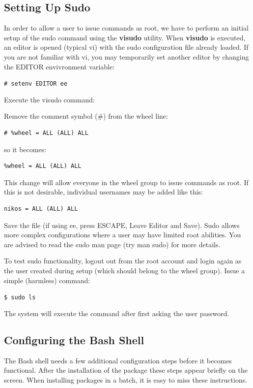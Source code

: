 \documentclass[a4paper,twoside,12pt]{article}
\newcommand{\coderoot}[1]{\texttt{\# #1}}
\newcommand{\codeuser}[1]{\texttt{\$ #1}}
\begin{document}
\subsection{Setting Up Sudo}
In order to allow a user to issue commands as root, we have to perform an initial setup of the sudo command using the \textbf{visudo} utility. When \textbf{visudo} is executed, an editor is opened (typical vi) with the sudo configuration file already loaded. If you are not familiar with vi, you may temporarily set another editor by changing the EDITOR envivronment variable:

\coderoot{setenv EDITOR ee}

Execute the visudo command:


Remove the comment symbol (#) from the wheel line:

\begin{verbatim}
# %wheel = ALL (ALL) ALL
\end{verbatim}

so it becomes:

\begin{verbatim}
%wheel = ALL (ALL) ALL
\end{verbatim}

This change will allow everyone in the wheel group to issue commands as root. If this is not desirable, individual usernames may be added like this:

\begin{verbatim}
nikos = ALL (ALL) ALL
\end{verbatim}

Save the file (if using ee, press ESCAPE, Leave Editor and Save).
Sudo allows more complex configurations where a user may have limited root abilities. You are advised to read the sudo man page (try man sudo) for more details.

To test sudo functionality, logout out from the root account and login again as the user created during setup (which should belong to the wheel group). Issue a simple (harmless) command:

\codeuser{sudo ls}

The system will execute the command after first asking the user password.

\subsection{Configuring the Bash Shell}
The Bash shell needs a few additional configuration steps before it becomes functional. After the installation of the package these steps appear briefly on the screen. When installing packages in a batch, it is easy to miss these instructions.
\end{document}
